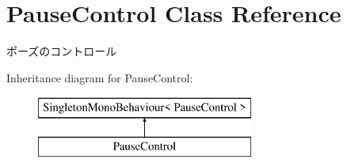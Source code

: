 \hypertarget{class_pause_control}{}\section{Pause\+Control Class Reference}
\label{class_pause_control}


ポーズのコントロール  


Inheritance diagram for Pause\+Control\+:\begin{figure}[H]
\begin{center}
\leavevmode
\includegraphics[height=2.000000cm]{class_pause_control}
\end{center}
\end{figure}
